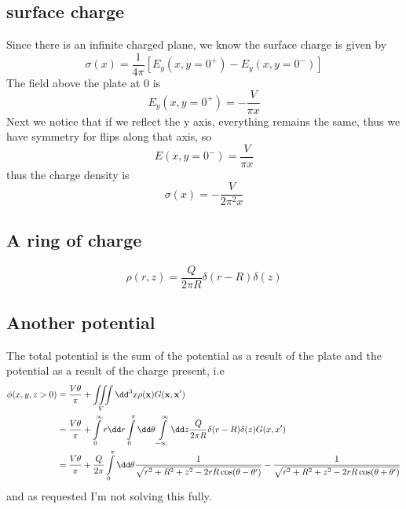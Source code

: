 \subsection{surface charge}
Since there is an infinite charged plane, we know the surface charge is given by
\begin{equation}
  \sigma(x) = \frac{1}{4\pi}[E_y(x,y=0^+)-E_y(x, y=0^-)]
\end{equation}
The field above the plate at 0 is
\begin{equation}
  E_y(x,y=0^+)=-\frac{V}{\pi x}
\end{equation}
Next we notice that if we reflect the y axis, everything remains the same, thus we have symmetry for flips along that axis, so
\begin{equation}
  E(x,y=0^-)=\frac{V}{\pi x}
\end{equation}
thus the charge density is
\begin{equation}
  \sigma(x) = -\frac{V}{2\pi^2 x}
\end{equation}
\subsection{A ring of charge}
\begin{equation}
  \rho(r,z)=\frac{Q}{2\pi R}\delta(r-R)\delta(z)
\end{equation}
\subsection{Another potential}
The total potential is the sum of the potential as a result of the plate and the potential as a result of the charge present, i.e
\begin{align}
  \phi(x,y,z>0)&=\frac{V\theta}{\pi}+\iiint\limits_V\dd^3x\rho(\bold x)G(\bold x,\bold x')\\
  &= \frac{V\theta}{\pi}+\int\limits_0^\infty r\dd r\int\limits_0^\pi\dd \theta \int\limits_{-\infty}^\infty\dd z\frac{Q}{2\pi R}\delta(r-R)\delta(z)G(x,x')\\
  &= \frac{V\theta}{\pi}+\frac{Q}{2\pi}\int\limits_0^\pi\dd\theta\frac{1}{\sqrt{r^2+R^2+z^2-2rR\cos(\theta-\theta')}}-\frac{1}{\sqrt{r^2+R^2+z^2-2rR\cos(\theta+\theta')}}
\end{align}
and as requested I'm not solving this fully.
